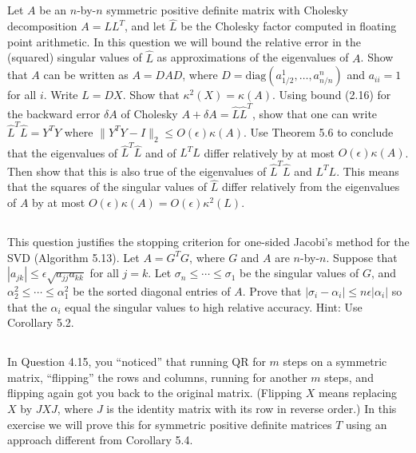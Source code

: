 \documentclass[a4paper]{ctexart}
\newcommand{\pf}{\textbf{\color{pink}{proof:}}}
\begin{document}
\pf

\subsection{}
Let $A$ be an $n$-by-$n$ symmetric positive definite matrix with Cholesky decomposition $A = LL^T$, and let $\hat{L}$ be the Cholesky factor computed in floating point arithmetic. In this question we will bound the relative error in the (squared) singular values of $\hat{L}$ as approximations of the eigenvalues of $A$. Show that $A$ can be written as $A = DAD$, where $D = \mathrm{diag}(a_{1/2}^1, \ldots, a_{n/n}^n)$ and $a_{ii} = 1$ for all $i$. Write $L = DX$. Show that $\kappa^2(X) = \kappa(A)$. Using bound (2.16) for the backward error $\delta A$ of Cholesky $A + \delta A = \hat{L}\hat{L}^T$, show that one can write $\hat{L}^T\hat{L} = Y^TY$ where $\|Y^TY - I\|_2 \leq O(\epsilon)\kappa(A)$. Use Theorem 5.6 to conclude that the eigenvalues of $\hat{L}^T\hat{L}$ and of $L^T L$ differ relatively by at most $O(\epsilon)\kappa(A)$. Then show that this is also true of the eigenvalues of $\hat{L}^T\hat{L}$ and $L^TL$. This means that the squares of the singular values of $\hat{L}$ differ relatively from the eigenvalues of $A$ by at most $O(\epsilon)\kappa(A) = O(\epsilon)\kappa^2(L)$.

\pf

\subsection{}
This question justifies the stopping criterion for one-sided Jacobi's method for the SVD (Algorithm 5.13). Let $A = G^TG$, where $G$ and $A$ are $n$-by-$n$. Suppose that $|a_{jk}| \leq \epsilon \sqrt{a_{jj} a_{kk}}$ for all $j = k$. Let $\sigma_n \leq \cdots \leq \sigma_1$ be the singular values of $G$, and $\alpha_2^2 \leq \cdots \leq \alpha_1^2$ be the sorted diagonal entries of $A$. Prove that $|\sigma_i - \alpha_i| \leq n\epsilon|\alpha_i|$ so that the $\alpha_i$ equal the singular values to high relative accuracy. Hint: Use Corollary 5.2.

\pf

\subsection{}
In Question 4.15, you “noticed” that running QR for $m$ steps on a symmetric matrix, “flipping” the rows and columns, running for another $m$ steps, and flipping again got you back to the original matrix. (Flipping $X$ means replacing $X$ by $JXJ$, where $J$ is the identity matrix with its row in reverse order.) In this exercise we will prove this for symmetric positive definite matrices $T$ using an approach different from Corollary 5.4.
\end{document}
